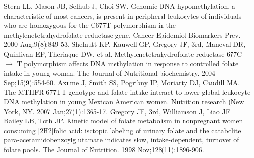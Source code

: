 \begin{thebibliography}{12}
		Stern LL, Mason JB, Selhub J, Choi SW. Genomic DNA hypomethylation, a characteristic of most cancers, is present in peripheral leukocytes of individuals who are homozygous for the C677T polymorphism in the methylenetetrahydrofolate reductase gene. Cancer Epidemiol Biomarkers Prev. 2000 Aug;9(8):849-53. 
		Shelnutt KP, Kauwell GP, Gregory JF, 3rd, Maneval DR, Quinlivan EP, Theriaque DW, et al. Methylenetetrahydrofolate reductase 677C $\rightarrow$ T polymorphism affects DNA methylation in response to controlled folate intake in young women. The Journal of Nutritional biochemistry. 2004 Sep;15(9):554-60. 
		Axume J, Smith SS, Pogribny IP, Moriarty DJ, Caudill MA. The MTHFR 677TT genotype and folate intake interact to lower global leukocyte DNA methylation in young Mexican American women. Nutrition research (New York, NY. 2007 Jan;27(1):1365-17. 
		Gregory JF, 3rd, Williamson J, Liao JF, Bailey LB, Toth JP. Kinetic model of folate metabolism in nonpregnant women consuming [2H2]folic acid: isotopic labeling of urinary folate and the catabolite para-acetamidobenzoylglutamate indicates slow, intake-dependent, turnover of folate pools. The Journal of Nutrition. 1998 Nov;128(11):1896-906. 
\end{thebibliography} 
